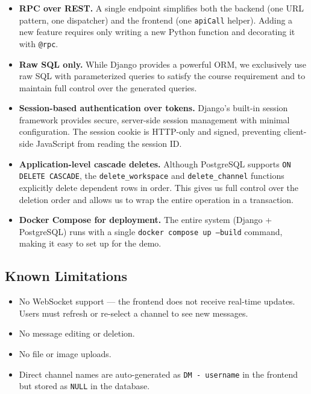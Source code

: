 \documentclass[11pt]{article}
\begin{document}
\begin{itemize}
    \item \textbf{RPC over REST.} A single endpoint simplifies both the backend (one URL pattern, one dispatcher) and the frontend (one \texttt{apiCall} helper). Adding a new feature requires only writing a new Python function and decorating it with \texttt{@rpc}.

    \item \textbf{Raw SQL only.} While Django provides a powerful ORM, we exclusively use raw SQL with parameterized queries to satisfy the course requirement and to maintain full control over the generated queries.

    \item \textbf{Session-based authentication over tokens.} Django's built-in session framework provides secure, server-side session management with minimal configuration. The session cookie is HTTP-only and signed, preventing client-side JavaScript from reading the session ID.

    \item \textbf{Application-level cascade deletes.} Although PostgreSQL supports \texttt{ON DELETE CASCADE}, the \texttt{delete\_workspace} and \texttt{delete\_channel} functions explicitly delete dependent rows in order. This gives us full control over the deletion order and allows us to wrap the entire operation in a transaction.

    \item \textbf{Docker Compose for deployment.} The entire system (Django + PostgreSQL) runs with a single \texttt{docker compose up --build} command, making it easy to set up for the demo.
\end{itemize}

\subsection{Known Limitations}

\begin{itemize}
    \item No WebSocket support --- the frontend does not receive real-time updates. Users must refresh or re-select a channel to see new messages.
    \item No message editing or deletion.
    \item No file or image uploads.
    \item Direct channel names are auto-generated as \texttt{DM - username} in the frontend but stored as \texttt{NULL} in the database.
\end{itemize}
\end{document}
